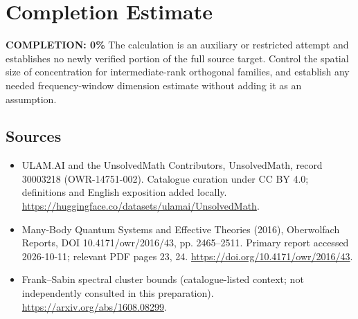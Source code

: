 \documentclass[11pt]{article}
\begin{document}
\section{Completion Estimate}
\noindent\textbf{COMPLETION: 0\%}
The calculation is an auxiliary or restricted attempt and establishes no newly verified portion of the full source target. Control the spatial size of concentration for intermediate-rank orthogonal families, and establish any needed frequency-window dimension estimate without adding it as an assumption.

\subsection{Sources}
\begin{itemize}
\item[\hypertarget{source:30003218:1}{S1}] ULAM.AI and the UnsolvedMath Contributors, UnsolvedMath, record 30003218 (OWR-14751-002). Catalogue curation under CC BY 4.0; definitions and English exposition added locally.
\url{https://huggingface.co/datasets/ulamai/UnsolvedMath}.
\item[\hypertarget{source:30003218:2}{S2}] Many-Body Quantum Systems and Effective Theories (2016), Oberwolfach Reports, DOI 10.4171/owr/2016/43, pp. 2465--2511. Primary report accessed 2026-10-11; relevant PDF pages 23, 24.
\url{https://doi.org/10.4171/owr/2016/43}.
\item[\hypertarget{source:30003218:3}{S3}] Frank--Sabin spectral cluster bounds (catalogue-listed context; not independently consulted in this preparation).
\url{https://arxiv.org/abs/1608.08299}.
\end{itemize}
\label{end:30003218}
\end{document}
